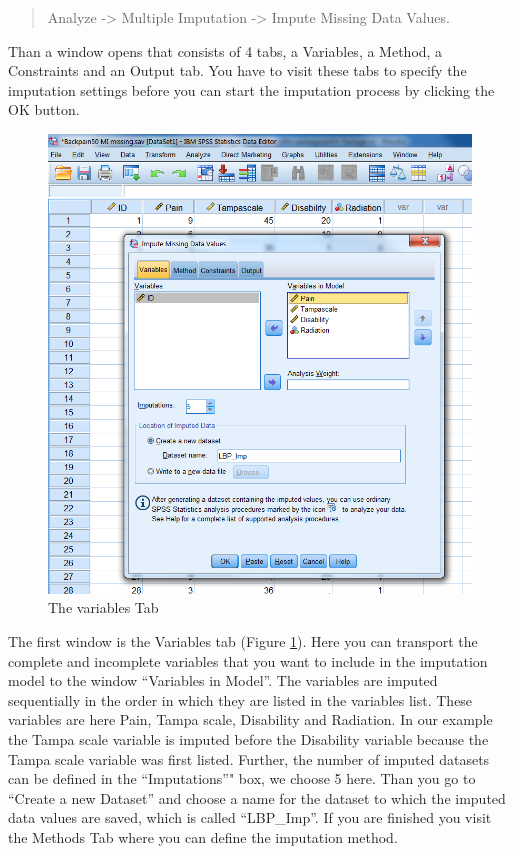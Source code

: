 \documentclass[]{book}
\begin{document}
\begin{quote}
Analyze -\textgreater{} Multiple Imputation -\textgreater{} Impute
Missing Data Values.
\end{quote}

Than a window opens that consists of 4 tabs, a Variables, a Method, a
Constraints and an Output tab. You have to visit these tabs to specify
the imputation settings before you can start the imputation process by
clicking the OK button.

\begin{figure}

{\centering \includegraphics[width=0.9\linewidth]{images/fig4.6} 

}

\caption{The variables Tab}\label{fig:fig4-6}
\end{figure}

The first window is the Variables tab (Figure \ref{fig:fig4-6}). Here
you can transport the complete and incomplete variables that you want to
include in the imputation model to the window ``Variables in Model''.
The variables are imputed sequentially in the order in which they are
listed in the variables list. These variables are here Pain, Tampa
scale, Disability and Radiation. In our example the Tampa scale variable
is imputed before the Disability variable because the Tampa scale
variable was first listed. Further, the number of imputed datasets can
be defined in the ``Imputations''" box, we choose 5 here. Than you go to
``Create a new Dataset'' and choose a name for the dataset to which the
imputed data values are saved, which is called ``LBP\_Imp''. If you are
finished you visit the Methods Tab where you can define the imputation
method.
\end{document}
